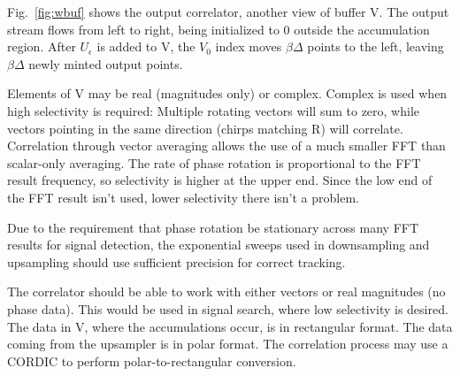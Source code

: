 Fig.~\ref{fig:wbuf} shows the output correlator, another view of buffer V.
The output stream flows from left to right,
being initialized to 0 outside the accumulation region.
After $U_\epsilon$ is added to V, the $V_0$ index moves $\beta\Delta$ points
to the left, leaving $\beta\Delta$ newly minted output points.

Elements of V may be real (magnitudes only) or complex.
Complex is used when high selectivity is required:
Multiple rotating vectors will sum to zero, while vectors pointing in the same
direction (chirps matching R) will correlate.
Correlation through vector averaging allows the use of a much smaller FFT than
scalar-only averaging.
The rate of phase rotation is proportional to the FFT result frequency,
so selectivity is higher at the upper end.
Since the low end of the FFT result isn't used,
lower selectivity there isn't a problem.

Due to the requirement that phase rotation be stationary across many FFT results
for signal detection, the exponential sweeps used in downsampling and upsampling
should use sufficient precision for correct tracking.

The correlator should be able to work with either vectors or real magnitudes
(no phase data).
This would be used in signal search, where low selectivity is desired.
The data in V, where the accumulations occur, is in rectangular format.
The data coming from the upsampler is in polar format.
The correlation process may use a CORDIC to perform polar-to-rectangular
conversion.
